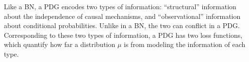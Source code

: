 Like a BN, a PDG encodes
two types of information: ``structural'' 
information about the independence of causal mechanisms,
and ``observational'' information
about conditional probabilities.
Unlike in a BN, the two can conflict in a PDG.
Corresponding to these two types of information,
a PDG has
two loss functions,
which quantify how far a distribution $\mu$ is from
modeling the information of each type.
%
